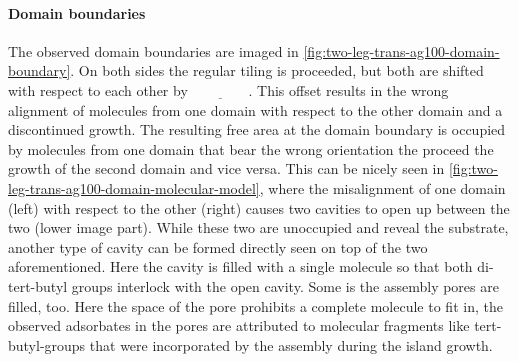 	\paragraph{Domain boundaries}
	The observed domain boundaries are imaged in \autoref{fig:two-leg-trans-ag100-domain-boundary}. On both sides the regular tiling is proceeded, but both are shifted with respect to each other by $\underline{\qquad \qquad}$. This offset results in the wrong alignment of molecules from one  domain with respect to the other domain and a discontinued growth. The resulting free area at the domain boundary is occupied by molecules from one domain that bear the wrong orientation the proceed the growth of the second domain and vice versa. This can be nicely seen in 		\autoref{fig:two-leg-trans-ag100-domain-molecular-model}, where the misalignment of one domain (left) with respect to the other (right) causes two cavities to open up between the two (lower image part). While these two are unoccupied and reveal the substrate, another type of cavity can be formed directly seen on top of the two aforementioned. Here the cavity is filled with a single molecule so that both di-tert-butyl groups interlock with the open cavity. Some is the assembly pores are filled, too. Here the space of the pore prohibits a complete molecule to fit in, the observed adsorbates in the pores are attributed to molecular fragments like tert-butyl-groups that were incorporated by the assembly during the island growth.
	
